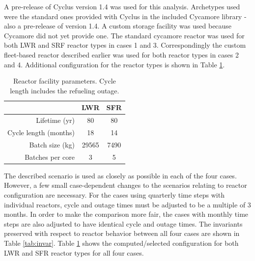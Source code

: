 \documentclass{style}
\begin{document}
A pre-release of Cyclus version 1.4 was used for this analysis.  Archetypes
used were the standard ones provided with Cyclus in the included Cycamore
library - also a pre-release of version 1.4.  A custom storage facility was
used because Cycamore did not yet provide one.  The standard cycamore reactor
was used for both LWR and SRF reactor types in cases 1 and 3.  Correspondingly
the custom fleet-based reactor described earlier was used for both reactor
types in cases 2 and 4.  Additional configuration for the reactor types is
shown in Table \ref{tab:reactors}.

\vspace{2mm}

\begin{table}[h]
    \centering
    \begin{tabular}{ |r | c c | }
        \hline                       
            & LWR & SFR \\
        \hline                       
        Lifetime (yr)         & 80 & 80 \\
        Cycle length (months) & 18 & 14 \\
        Batch size (kg)       & 29565 & 7490 \\
        Batches per core      & 3 & 5 \\
        \hline                       
    \end{tabular}
    \captionsetup{justification=centering}
    \caption[Reactor facility parameters]{Reactor facility parameters. Cycle length includes the refueling outage.}
    \label{tab:reactors}
\end{table}

The described scenario is used as closely as possible in each of the four
cases.  However, a few small case-dependent changes to the scenarios relating to
reactor configuration are necessary.  For the cases using quarterly time steps
with individual reactors, cycle and outage times must be adjusted to be a
multiple of 3 months.  In order to make the comparison more fair, the cases
with monthly time steps are also adjusted to have identical cycle and outage
times.  The invariants preserved with respect to reactor behavior between all
four cases are shown in Table \ref{tab:invar}.  Table \ref{tab:reactors} shows
the computed/selected configuration for both LWR and SFR reactor types for all
four cases.
\end{document}
